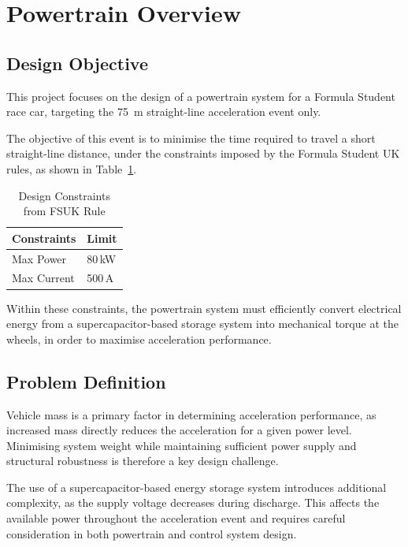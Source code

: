 
\section{Powertrain Overview}

\subsection{Design Objective}

This project focuses on the design of a powertrain system for a Formula Student race car, targeting the \SI{75}{\meter} straight-line acceleration event only.

The objective of this event is to minimise the time required to travel a short straight-line distance, under the constraints imposed by the Formula Student UK rules, as shown in Table~\ref{tab:FSUK_constraints}.

\begin{table}[H]
\centering
\small

\caption{Design Constraints from FSUK Rule\cite{fs-ev-rules2026}}
\label{tab:FSUK_constraints}

\begin{tabular}{ll}
\toprule
\textbf{Constraints} & \textbf{Limit} \\
\midrule
Max Power & 80\,kW \\
Max Current & 500\,A \\
\bottomrule
\end{tabular}
\end{table}

Within these constraints, the powertrain system must efficiently convert electrical energy from a supercapacitor-based storage system into mechanical torque at the wheels, in order to maximise acceleration performance.

\subsection{Problem Definition}

Vehicle mass is a primary factor in determining acceleration performance, as increased mass directly reduces the acceleration for a given power level. Minimising system weight while maintaining sufficient power supply and structural robustness is therefore a key design challenge.

The use of a supercapacitor-based energy storage system introduces additional complexity, as the supply voltage decreases during discharge. This affects the available power throughout the acceleration event and requires careful consideration in both powertrain and control system design.

